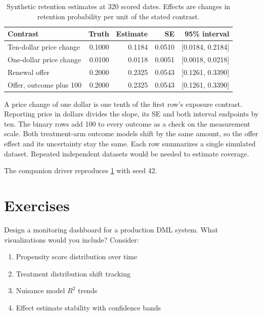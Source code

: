 \begin{table}[htbp]
\centering
\caption{Synthetic retention estimates at 320 scored dates. Effects are changes in retention probability per unit of the stated contrast.}
\label{tab:ch10_retention}
\footnotesize
\setlength{\tabcolsep}{3pt}
\begin{tabular}{@{}lrrrr@{}}
\toprule
Contrast & Truth & Estimate & SE & 95\% interval \\
\midrule
Ten-dollar price change & 0.1000 & 0.1184 & 0.0510 & [0.0184, 0.2184] \\
One-dollar price change & 0.0100 & 0.0118 & 0.0051 & [0.0018, 0.0218] \\
Renewal offer & 0.2000 & 0.2325 & 0.0543 & [0.1261, 0.3390] \\
Offer, outcome plus 100 & 0.2000 & 0.2325 & 0.0543 & [0.1261, 0.3390] \\
\bottomrule
\end{tabular}
\end{table}

A price change of one dollar is one tenth of the first row's exposure contrast. Reporting price in dollars divides the slope, its SE and both interval endpoints by ten. The binary rows add 100 to every outcome as a check on the measurement scale. Both treatment-arm outcome models shift by the same amount, so the offer effect and its uncertainty stay the same. Each row summarizes a single simulated dataset. Repeated independent datasets would be needed to estimate coverage.

The companion driver reproduces \cref{tab:ch10_retention} with seed 42.


\section{Exercises}\label{sec:ch10_exercises}

\begin{exercise}
Design a monitoring dashboard for a production DML system. What visualizations would you include? Consider:
\begin{enumerate}
    \item Propensity score distribution over time
    \item Treatment distribution shift tracking
    \item Nuisance model $R^2$ trends
    \item Effect estimate stability with confidence bands
\end{enumerate}
\end{exercise}


